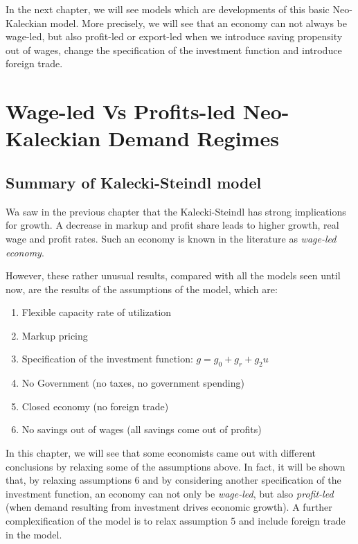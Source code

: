 \documentclass[
  letterpaper,
  DIV=11,
  numbers=noendperiod]{scrreprt}
\providecommand{\tightlist}{%
  \setlength{\itemsep}{0pt}\setlength{\parskip}{0pt}}\usepackage{longtable,booktabs,array}
\begin{document}
In the next chapter, we will see models which are developments of this
basic Neo-Kaleckian model. More precisely, we will see that an economy
can not always be wage-led, but also profit-led or export-led when we
introduce saving propensity out of wages, change the specification of
the investment function and introduce foreign trade.

\hypertarget{wage-led-vs-profits-led-neo-kaleckian-demand-regimes}{%
\chapter{Wage-led Vs Profits-led Neo-Kaleckian Demand
Regimes}\label{wage-led-vs-profits-led-neo-kaleckian-demand-regimes}}

\hypertarget{summary-of-kalecki-steindl-model}{%
\section{Summary of Kalecki-Steindl
model}\label{summary-of-kalecki-steindl-model}}

Wa saw in the previous chapter that the Kalecki-Steindl has strong
implications for growth. A decrease in markup and profit share leads to
higher growth, real wage and profit rates. Such an economy is known in
the literature as \emph{wage-led economy}.

However, these rather unusual results, compared with all the models seen
until now, are the results of the assumptions of the model, which are:

\begin{enumerate}
\def\labelenumi{\arabic{enumi}.}
\tightlist
\item
  Flexible capacity rate of utilization
\item
  Markup pricing
\item
  Specification of the investment function: \(g = g_0 + g_r + g_2u\)
\item
  No Government (no taxes, no government spending)
\item
  Closed economy (no foreign trade)
\item
  No savings out of wages (all savings come out of profits)
\end{enumerate}

In this chapter, we will see that some economists came out with
different conclusions by relaxing some of the assumptions above. In
fact, it will be shown that, by relaxing assumptions 6 and by
considering another specification of the investment function, an economy
can not only be \emph{wage-led}, but also \emph{profit-led} (when demand
resulting from investment drives economic growth). A further
complexification of the model is to relax assumption 5 and include
foreign trade in the model.
\end{document}
